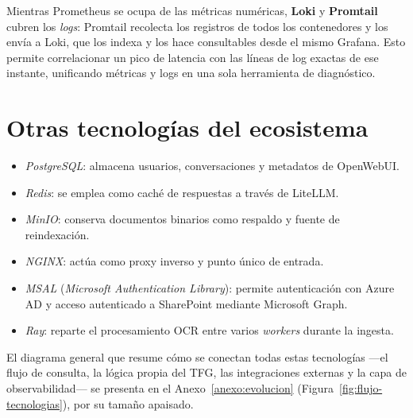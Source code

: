 Mientras Prometheus se ocupa de las métricas numéricas, \textbf{Loki} y \textbf{Promtail} cubren los \textit{logs}: Promtail recolecta los registros de todos los contenedores y los envía a Loki, que los indexa y los hace consultables desde el mismo Grafana. Esto permite correlacionar un pico de latencia con las líneas de log exactas de ese instante, unificando métricas y logs en una sola herramienta de diagnóstico.

\section{Otras tecnologías del ecosistema}
\label{sec:otras-tecnologias}

\begin{itemize}
    \item \textit{PostgreSQL}: almacena usuarios, conversaciones y metadatos de OpenWebUI.
    \item \textit{Redis}: se emplea como caché de respuestas a través de LiteLLM.
    \item \textit{MinIO}: conserva documentos binarios como respaldo y fuente de reindexación.
    \item \textit{NGINX}: actúa como proxy inverso y punto único de entrada.
    \item \textit{MSAL} (\textit{Microsoft Authentication Library}): permite autenticación con Azure AD y acceso autenticado a SharePoint mediante Microsoft Graph.
    \item \textit{Ray}: reparte el procesamiento OCR entre varios \textit{workers} durante la ingesta.
\end{itemize}

El diagrama general que resume cómo se conectan todas estas tecnologías ---el flujo de consulta, la lógica propia del TFG, las integraciones externas y la capa de observabilidad--- se presenta en el Anexo~\ref{anexo:evolucion} (Figura~\ref{fig:flujo-tecnologias}), por su tamaño apaisado.
